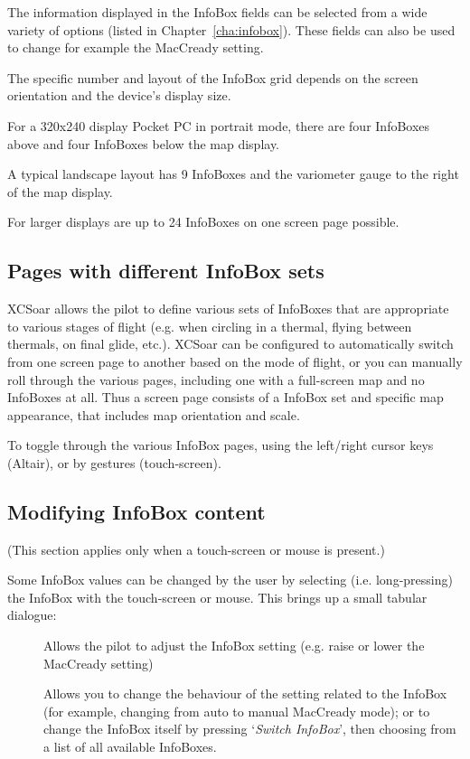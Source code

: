 The information displayed in the InfoBox fields can be selected from a
wide variety of options (listed in Chapter~\ref{cha:infobox}). These
fields can also be used to change for example the MacCready setting.

The specific number and layout of the InfoBox grid depends on the
screen orientation and the device's display size.  

For a 320x240 display
Pocket PC in portrait mode, there are four InfoBoxes above and four
InfoBoxes below the map display.  

A typical landscape layout has 9 InfoBoxes and the variometer gauge 
to the right of the map display. 
 
For larger displays are up to 24 InfoBoxes on one screen page possible.


\subsection*{Pages with different InfoBox sets}

XCSoar allows the pilot to define various sets of InfoBoxes that are 
appropriate to various stages of flight (e.g. when circling in a thermal, 
flying between thermals, on final glide, etc.). XCSoar can be configured 
to automatically switch from one screen page to another based on the mode 
of flight, or you can manually roll through the various pages, including 
one with a full-screen map and no InfoBoxes at all. Thus a screen page 
consists of a InfoBox set and specific map appearance, that includes 
map orientation and scale.

To toggle through the various InfoBox pages, using the left/right cursor 
keys (Altair), or by gestures (touch-screen).


\subsection*{Modifying InfoBox content}

(This section applies only when a touch-screen or mouse is present.)

Some InfoBox values can be changed by the user by selecting (i.e. long-pressing) the
InfoBox with the touch-screen or mouse.  This brings up a small tabular dialogue:

\begin{description}
\item[]  
  Allows the pilot to adjust the InfoBox setting (e.g. raise or lower the 
  MacCready setting)

\item[]
  Allows you to change the behaviour of the setting related to the InfoBox 
  (for example, changing from auto to manual MacCready mode); or 
  to change the InfoBox itself by pressing `{\it Switch InfoBox}', then 
  choosing from a list of all available InfoBoxes.

\end{description}

